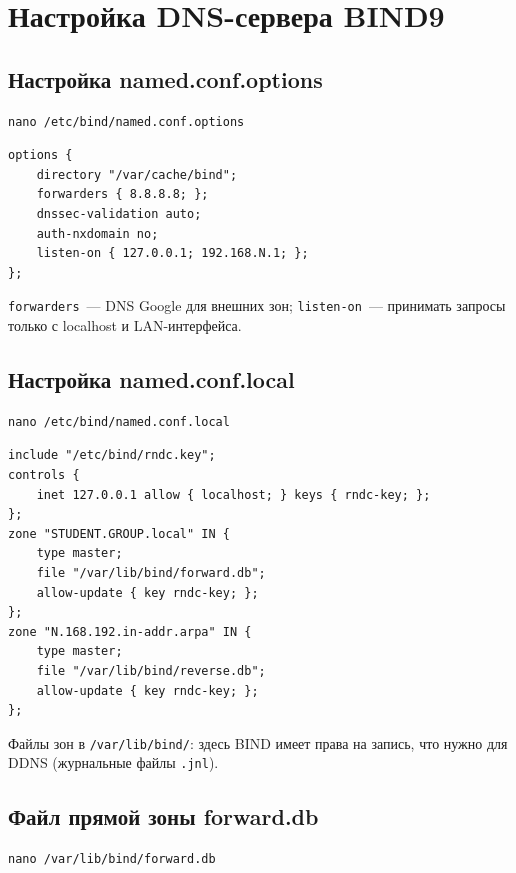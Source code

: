 \section{Настройка DNS-сервера BIND9}

\subsection{Настройка named.conf.options}

\begin{lstlisting}
nano /etc/bind/named.conf.options
\end{lstlisting}

\begin{lstlisting}
options {
    directory "/var/cache/bind";
    forwarders { 8.8.8.8; };
    dnssec-validation auto;
    auth-nxdomain no;
    listen-on { 127.0.0.1; 192.168.N.1; };
};
\end{lstlisting}

\texttt{forwarders}~--- DNS Google для внешних зон; \texttt{listen-on}~--- принимать запросы только с localhost и LAN-интерфейса.

\subsection{Настройка named.conf.local}

\begin{lstlisting}
nano /etc/bind/named.conf.local
\end{lstlisting}

\begin{lstlisting}
include "/etc/bind/rndc.key";
controls {
    inet 127.0.0.1 allow { localhost; } keys { rndc-key; };
};
zone "STUDENT.GROUP.local" IN {
    type master;
    file "/var/lib/bind/forward.db";
    allow-update { key rndc-key; };
};
zone "N.168.192.in-addr.arpa" IN {
    type master;
    file "/var/lib/bind/reverse.db";
    allow-update { key rndc-key; };
};
\end{lstlisting}

Файлы зон в \texttt{/var/lib/bind/}: здесь BIND имеет права на запись, что нужно для DDNS (журнальные файлы \texttt{.jnl}).

\subsection{Файл прямой зоны forward.db}

\begin{lstlisting}
nano /var/lib/bind/forward.db
\end{lstlisting}

